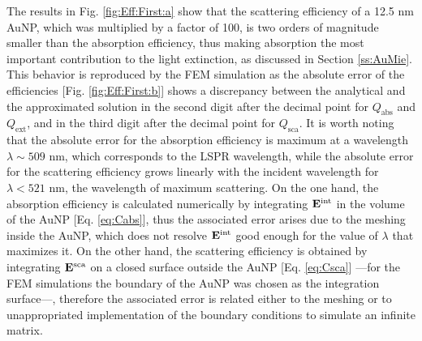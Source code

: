 The results in Fig. \ref{fig:Eff:First:a} show that the scattering efficiency of a 12.5 nm AuNP, which was multiplied by a factor of 100, is two orders of magnitude smaller than the absorption efficiency, thus making absorption the most important contribution to the light extinction, as discussed in Section \ref{ss:AuMie}. This behavior is reproduced by the FEM simulation as the absolute error of the efficiencies [Fig. \ref{fig:Eff:First:b}] shows a discrepancy between the analytical and the approximated solution in the second digit after the decimal point for $Q_\text{abs}$ and $Q_\text{ext}$, and in the third digit after the decimal point for $Q_\text{sca}$. It is worth noting that the absolute error for the absorption efficiency is maximum at a wavelength $\lambda\sim 509$ nm, which corresponds to the LSPR wavelength, while the absolute error for the scattering efficiency grows linearly with the incident wavelength for $\lambda < 521$ nm, the wavelength of maximum scattering. On the one hand, the absorption efficiency is calculated numerically by integrating $\vb{E}^\text{int}$ in the volume of the AuNP [Eq. \eqref{eq:Cabs}], thus the associated error arises due to the meshing inside the AuNP, which does not resolve $\vb{E}^\text{int}$ good enough for the value of $\lambda$ that maximizes it. On the other hand, the scattering efficiency is obtained by integrating $\vb{E}^\text{sca}$ on a closed surface outside the AuNP [Eq. \eqref{eq:Csca}] ---for the FEM simulations the boundary of the AuNP was chosen as the integration surface---, therefore the associated error is related either to the meshing or to unappropriated implementation of the boundary conditions to simulate an infinite matrix.


